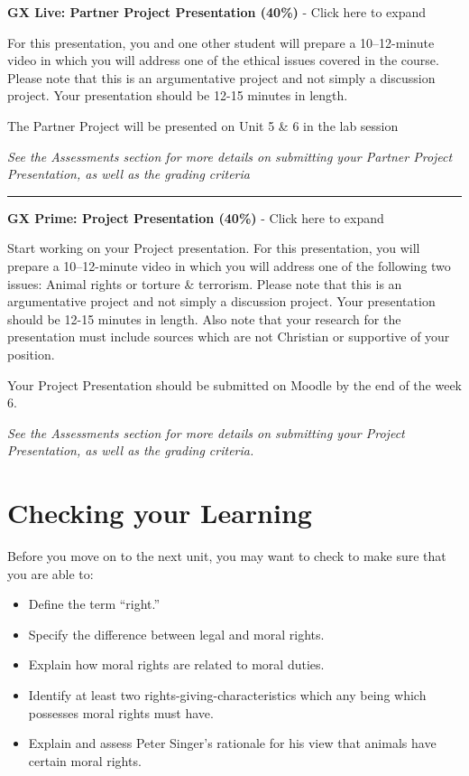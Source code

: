 \documentclass[
]{book}
\providecommand{\tightlist}{%
  \setlength{\itemsep}{0pt}\setlength{\parskip}{0pt}}
\begin{document}
\begin{assessment}
\textbf{GX Live: Partner Project Presentation (40\%)} - Click here to expand

For this presentation, you and one other student will prepare a 10--12-minute video in which you will address one of the ethical issues covered in the course. Please note that this is an argumentative project and not simply a discussion project. Your presentation should be 12-15 minutes in length.

The Partner Project will be presented on Unit 5 \& 6 in the lab session

\emph{See the Assessments section for more details on submitting your Partner Project Presentation, as well as the grading criteria}

\begin{center}\rule{0.5\linewidth}{0.5pt}\end{center}

\textbf{GX Prime: Project Presentation (40\%)} - Click here to expand

Start working on your Project presentation. For this presentation, you will prepare a 10--12-minute video in which you will address one of the following two issues: Animal rights or torture \& terrorism. Please note that this is an argumentative project and not simply a discussion project. Your presentation should be 12-15 minutes in length. Also note that your research for the presentation must include sources which are not Christian or supportive of your position.

Your Project Presentation should be submitted on Moodle by the end of the week 6.

\emph{See the Assessments section for more details on submitting your Project Presentation, as well as the grading criteria.}
\end{assessment}

\hypertarget{checking-your-learning-4}{%
\section*{Checking your Learning}\label{checking-your-learning-4}}

\begin{progress}
Before you move on to the next unit, you may want to check to make sure that you are able to:

\begin{itemize}
\tightlist
\item
  Define the term ``right.''
\item
  Specify the difference between legal and moral rights.
\item
  Explain how moral rights are related to moral duties.
\item
  Identify at least two rights-giving-characteristics which any being which possesses moral rights must have.
\item
  Explain and assess Peter Singer's rationale for his view that animals have certain moral rights.
\end{itemize}
\end{progress}
\end{document}
